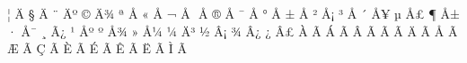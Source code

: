 \mubyte ^^a6 ^^c4^^99\endmubyte %
\mubyte ^^a7 ^^c4^^9f\endmubyte %
\mubyte ^^a8 ^^c4^^ba\endmubyte %
\mubyte ^^a9 ^^c4^^be\endmubyte %
\mubyte ^^aa ^^c5^^82\endmubyte %
\mubyte ^^ab ^^c5^^84\endmubyte %
\mubyte ^^ac ^^c5^^88\endmubyte %
\mubyte ^^ad ^^c5^^8b\endmubyte %
\mubyte ^^ae ^^c5^^91\endmubyte %
\mubyte ^^af ^^c5^^95\endmubyte %
\mubyte ^^b0 ^^c5^^99\endmubyte %
\mubyte ^^b1 ^^c5^^9b\endmubyte %
\mubyte ^^b2 ^^c5^^a1\endmubyte %
\mubyte ^^b3 ^^c5^^9f\endmubyte %
\mubyte ^^b4 ^^c5^^a5\endmubyte %
\mubyte ^^b5 ^^c5^^a3\endmubyte %
\mubyte ^^b6 ^^c5^^b1\endmubyte %
\mubyte ^^b7 ^^c5^^af\endmubyte %
\mubyte ^^b8 ^^c3^^bf\endmubyte %
\mubyte ^^b9 ^^c5^^ba\endmubyte %
\mubyte ^^ba ^^c5^^be\endmubyte %
\mubyte ^^bb ^^c5^^bc\endmubyte %
\mubyte ^^bc ^^c4^^b3\endmubyte %
\mubyte ^^bd ^^c2^^a1\endmubyte %
\mubyte ^^be ^^c2^^bf\endmubyte %
\mubyte ^^bf ^^c2^^a3\endmubyte %
\mubyte ^^c0 ^^c3^^80\endmubyte %
\mubyte ^^c1 ^^c3^^81\endmubyte %
\mubyte ^^c2 ^^c3^^82\endmubyte %
\mubyte ^^c3 ^^c3^^83\endmubyte %
\mubyte ^^c4 ^^c3^^84\endmubyte %
\mubyte ^^c5 ^^c3^^85\endmubyte %
\mubyte ^^c6 ^^c3^^86\endmubyte %
\mubyte ^^c7 ^^c3^^87\endmubyte %
\mubyte ^^c8 ^^c3^^88\endmubyte %
\mubyte ^^c9 ^^c3^^89\endmubyte %
\mubyte ^^ca ^^c3^^8a\endmubyte %
\mubyte ^^cb ^^c3^^8b\endmubyte %
\mubyte ^^cc ^^c3^^8c\endmubyte %

